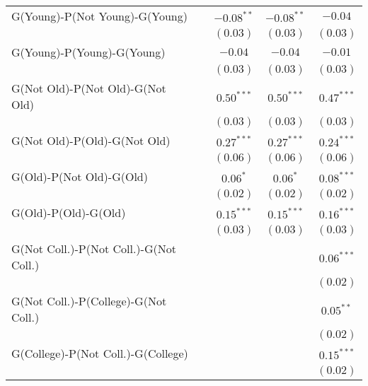 \begin{center}
\begin{longtable}{l c c c c}
G(Young)-P(Not Young)-G(Young)         &               & $-0.08^{**}$  & $-0.08^{**}$  & $-0.04$       \\
                                       &               & $(0.03)$      & $(0.03)$      & $(0.03)$      \\
G(Young)-P(Young)-G(Young)             &               & $-0.04$       & $-0.04$       & $-0.01$       \\
                                       &               & $(0.03)$      & $(0.03)$      & $(0.03)$      \\
G(Not Old)-P(Not Old)-G(Not Old)       &               & $0.50^{***}$  & $0.50^{***}$  & $0.47^{***}$  \\
                                       &               & $(0.03)$      & $(0.03)$      & $(0.03)$      \\
G(Not Old)-P(Old)-G(Not Old)           &               & $0.27^{***}$  & $0.27^{***}$  & $0.24^{***}$  \\
                                       &               & $(0.06)$      & $(0.06)$      & $(0.06)$      \\
G(Old)-P(Not Old)-G(Old)               &               & $0.06^{*}$    & $0.06^{*}$    & $0.08^{***}$  \\
                                       &               & $(0.02)$      & $(0.02)$      & $(0.02)$      \\
G(Old)-P(Old)-G(Old)                   &               & $0.15^{***}$  & $0.15^{***}$  & $0.16^{***}$  \\
                                       &               & $(0.03)$      & $(0.03)$      & $(0.03)$      \\
G(Not Coll.)-P(Not Coll.)-G(Not Coll.) &               &               &               & $0.06^{***}$  \\
                                       &               &               &               & $(0.02)$      \\
G(Not Coll.)-P(College)-G(Not Coll.)   &               &               &               & $0.05^{**}$   \\
                                       &               &               &               & $(0.02)$      \\
G(College)-P(Not Coll.)-G(College)     &               &               &               & $0.15^{***}$  \\
                                       &               &               &               & $(0.02)$      \\

\end{longtable}
\end{center}
